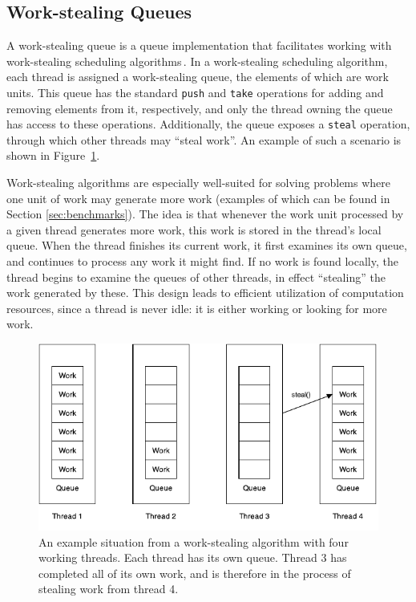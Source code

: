 \subsection{Work-stealing Queues} %
A work-stealing queue is a queue implementation that facilitates working with work-stealing scheduling algorithms\,\citep{Arora:1998:TSM:277651.277678}. In a work-stealing scheduling algorithm, each thread is assigned a work-stealing queue, the elements of which are work units. This queue has the standard \texttt{push} and \texttt{take} operations for adding and removing elements from it, respectively, and only the thread owning the queue has access to these operations. Additionally, the queue exposes a \texttt{steal} operation, through which other threads may ``steal work''. An example of such a scenario is shown in Figure~\ref{fig:workstealing_scenario}.

Work-stealing algorithms are especially well-suited for solving problems where one unit of work may generate more work (examples of which can be found in Section \ref{sec:benchmarks}). The idea is that whenever the work unit processed by a given thread generates more work, this work is stored in the thread's local queue. When the thread finishes its current work, it first examines its own queue, and continues to process any work it might find. If no work is found locally, the thread begins to examine the queues of other threads, in effect ``stealing'' the work generated by these. This design leads to efficient utilization of computation resources, since a thread is never idle: it is either working or looking for more work.

\begin{figure}
\begin{center}
\includegraphics[scale=1]{resources/WSQ.pdf}
\end{center}
\caption{An example situation from a work-stealing algorithm with four working threads. Each thread has its own queue. Thread 3 has completed all of its own work, and is therefore in the process of stealing work from thread 4.}
\label{fig:workstealing_scenario}
\end{figure}

